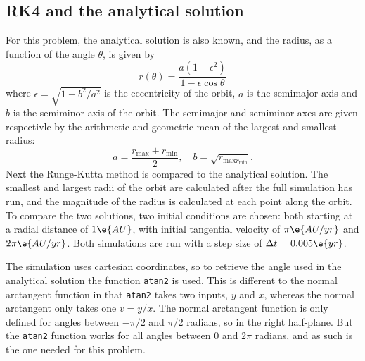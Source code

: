 \documentclass[a4paper,10pt]{article} 	%
\numberwithin{equation}{section}
\begin{document}
	\subsection{RK4 and the analytical solution}
	For this problem, the analytical solution is also known, and the radius, as a function of the angle $ \theta $, is given by
	\begin{equation}
		r(\theta) = \frac{a(1-\epsilon^2)}{1-\epsilon \cos \theta}
	\end{equation}
	where $ \epsilon = \sqrt{1-b^2/a^2}$ is the eccentricity of the orbit, $ a $ is the semimajor axis and $ b $ is the semiminor axis of the orbit. The semimajor and semiminor axes are given respectivle by the arithmetic and geometric mean of the largest and smallest radius:
	\begin{equation}
		a = \frac{r_{\text{max}}+r_{\text{min}}}{2}, \quad b = \sqrt{r_{\text{max}r_{\text{min}}}}.
	\end{equation}
	Next the Runge-Kutta method is compared to the analytical solution. The smallest and largest radii of the orbit are calculated after the full simulation has run, and the magnitude of the radius is calculated at each point along the orbit. To compare the two solutions, two initial conditions are chosen: both starting at a radial distance of $ 1 \e{AU} $, with initial tangential velocity of $ \pi \e{AU/yr} $ and $ 2 \pi \e{AU/yr} $. Both simulations are run with a step size of $ \Delta t  = 0.005 \e{yr} $.
	
	The simulation uses cartesian coordinates, so to retrieve the angle used in the analytical solution the function \texttt{atan2} is used. This is different to the normal arctangent function in that \texttt{atan2} takes two inputs, $ y $ and $ x $, whereas the normal arctangent only takes one $ v = y/x $. The normal arctangent function is only defined for angles between $ -\pi/2 $ and $ \pi/2 $ radians, so in the right half-plane. But the \texttt{atan2} function works for all angles between $ 0 $ and $ 2\pi $ radians, and as such is the one needed for this problem.
	
\end{document}

